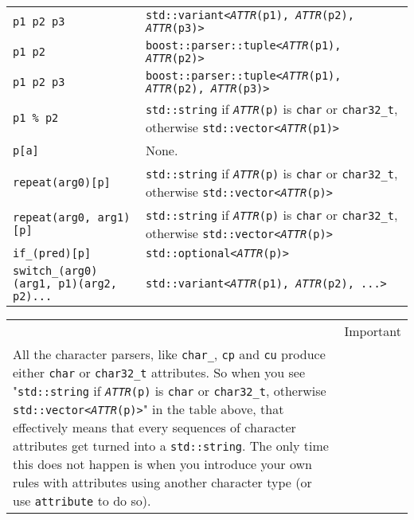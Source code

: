 \begin{longtable}[]{@{}ll@{}}
\texttt{p1 \textbar{} p2 \textbar{} p3} & \texttt{std::variant<}\emph{\texttt{ATTR}}\texttt{(p1), }\emph{\texttt{ATTR}}\texttt{(p2), }\emph{\texttt{ATTR}}\texttt{(p3)>} \\
\texttt{p1 \textbar{}\textbar{} p2} & \texttt{boost::parser::tuple<}\emph{\texttt{ATTR}}\texttt{(p1), }\emph{\texttt{ATTR}}\texttt{(p2)>} \\
\texttt{p1 \textbar{}\textbar{} p2 \textbar{}\textbar{} p3} & \texttt{boost::parser::tuple<}\emph{\texttt{ATTR}}\texttt{(p1), }\emph{\texttt{ATTR}}\texttt{(p2), }\emph{\texttt{ATTR}}\texttt{(p3)>} \\
\texttt{p1 \% p2} & \texttt{std::string} if \emph{\texttt{ATTR}}\texttt{(p)} is \texttt{char} or \texttt{char32\_t}, otherwise \texttt{std::vector<}\emph{\texttt{ATTR}}\texttt{(p1)>} \\
\texttt{p{[}a{]}} & None. \\
\texttt{repeat(arg0){[}p{]}} & \texttt{std::string} if \emph{\texttt{ATTR}}\texttt{(p)} is \texttt{char} or \texttt{char32\_t}, otherwise \texttt{std::vector<}\emph{\texttt{ATTR}}\texttt{(p)>} \\
\texttt{repeat(arg0, arg1){[}p{]}} & \texttt{std::string} if \emph{\texttt{ATTR}}\texttt{(p)} is \texttt{char} or \texttt{char32\_t}, otherwise \texttt{std::vector<}\emph{\texttt{ATTR}}\texttt{(p)>} \\
\texttt{if\_(pred){[}p{]}} & \texttt{std::optional<}\emph{\texttt{ATTR}}\texttt{(p)>} \\
\texttt{switch\_(arg0)(arg1, p1)(arg2, p2)...} & \texttt{std::variant<}\emph{\texttt{ATTR}}\texttt{(p1), }\emph{\texttt{ATTR}}\texttt{(p2), ...>} \\
\end{longtable}

\hfill\break

\begin{longtable}[]{@{}
  >{\raggedright\arraybackslash}p{}
  >{\raggedright\arraybackslash}p{}@{}}
\toprule\noalign{}
\endhead
\bottomrule\noalign{}
\endlastfoot
\begin{minipage}[t]{\linewidth}\raggedright
\end{minipage} & Important \\
All the character parsers, like \texttt{char\_}, \texttt{cp} and \texttt{cu} produce either \texttt{char} or \texttt{char32\_t} attributes. So when you see "\texttt{std::string} if \emph{\texttt{ATTR}}\texttt{(p)} is \texttt{char} or \texttt{char32\_t}, otherwise \texttt{std::vector<}\emph{\texttt{ATTR}}\texttt{(p)>}" in the table above, that effectively means that every sequences of character attributes get turned into a \texttt{std::string}. The only time this does not happen is when you introduce your own rules with attributes using another character type (or use \texttt{attribute} to do so). & \\
\end{longtable}


